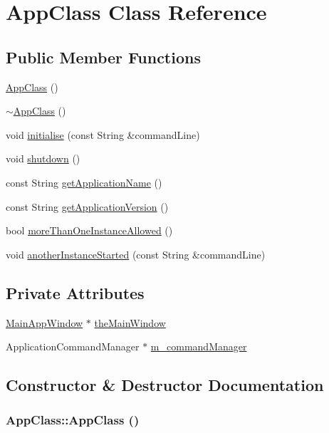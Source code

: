 \hypertarget{class_app_class}{
\section{AppClass Class Reference}
\label{class_app_class}
}
\subsection*{Public Member Functions}
\begin{CompactItemize}
\item 
\hyperlink{class_app_class_53cb4f657bb4c5382a38e3efed59cbd2}{AppClass} ()
\item 
\hyperlink{class_app_class_1bd714a99c6dadf6d662e15f27c77367}{$\sim$AppClass} ()
\item 
void \hyperlink{class_app_class_c62f2650a80211009624ff3216f9d8e3}{initialise} (const String \&commandLine)
\item 
void \hyperlink{class_app_class_7c67ebf5b041078af03f11873954e1e9}{shutdown} ()
\item 
const String \hyperlink{class_app_class_8693d0a11cb9066661a4214ffb9d3f63}{getApplicationName} ()
\item 
const String \hyperlink{class_app_class_1920f8e52b72532e579d9f9c8706298b}{getApplicationVersion} ()
\item 
bool \hyperlink{class_app_class_caeaf54d62cd78bed89ff531071aa2c2}{moreThanOneInstanceAllowed} ()
\item 
void \hyperlink{class_app_class_40814b9baad74a9f271230bbf7e073a6}{anotherInstanceStarted} (const String \&commandLine)
\end{CompactItemize}
\subsection*{Private Attributes}
\begin{CompactItemize}
\item 
\hyperlink{class_main_app_window}{MainAppWindow} $\ast$ \hyperlink{class_app_class_0ff1f432b52ab3f4121b6b6fe5b13e5a}{theMainWindow}
\item 
ApplicationCommandManager $\ast$ \hyperlink{class_app_class_f5b253e442714a25f4feb5b0bb4911c1}{m\_\-commandManager}
\end{CompactItemize}


\subsection{Constructor \& Destructor Documentation}
\hypertarget{class_app_class_53cb4f657bb4c5382a38e3efed59cbd2}{
\subsubsection[{AppClass}]{\setlength{\rightskip}{0pt plus 5cm}AppClass::AppClass ()}}
\label{class_app_class_53cb4f657bb4c5382a38e3efed59cbd2}


